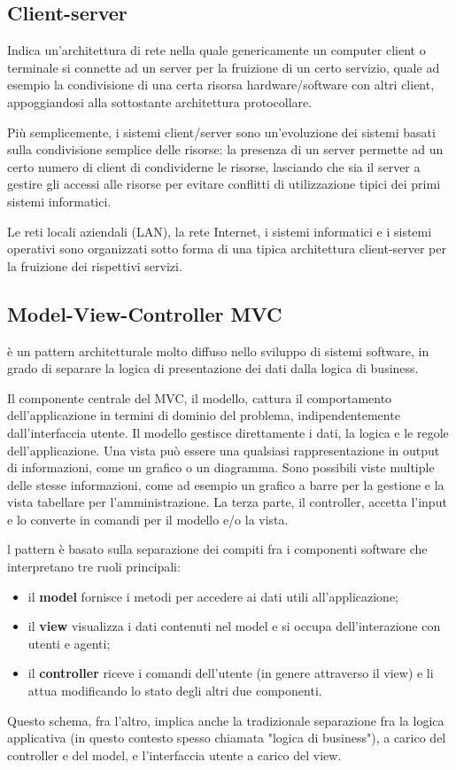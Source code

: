 \subsection{Client-server}
Indica un'architettura di rete nella quale genericamente un computer client o terminale si connette ad un server per la fruizione di un certo servizio, quale ad esempio la condivisione di una certa risorsa hardware/software con altri client, appoggiandosi alla sottostante architettura protocollare.

Più semplicemente, i sistemi client/server sono un'evoluzione dei sistemi basati sulla condivisione semplice delle risorse: la presenza di un server permette ad un certo numero di client di condividerne le risorse, lasciando che sia il server a gestire gli accessi alle risorse per evitare conflitti di utilizzazione tipici dei primi sistemi informatici.

Le reti locali aziendali (LAN), la rete Internet, i sistemi informatici e i sistemi operativi sono organizzati sotto forma di una tipica architettura client-server per la fruizione dei rispettivi servizi.
\subsection{Model-View-Controller MVC}
è un pattern architetturale molto diffuso nello sviluppo di sistemi software, in grado di separare la logica di presentazione dei dati dalla logica di business.

Il componente centrale del MVC, il modello, cattura il comportamento dell'applicazione in termini di dominio del problema, indipendentemente dall'interfaccia utente. Il modello gestisce direttamente i dati, la logica e le regole dell'applicazione. Una vista può essere una qualsiasi rappresentazione in output di informazioni, come un grafico o un diagramma. Sono possibili viste multiple delle stesse informazioni, come ad esempio un grafico a barre per la gestione e la vista tabellare per l'amministrazione. La terza parte, il controller, accetta l'input e lo converte in comandi per il modello e/o la vista.

l pattern è basato sulla separazione dei compiti fra i componenti software che interpretano tre ruoli principali:
\begin{itemize}
\item il \textbf{model} fornisce i metodi per accedere ai dati utili all'applicazione;
\item il \textbf{view} visualizza i dati contenuti nel model e si occupa dell'interazione con utenti e agenti;
\item il \textbf{controller} riceve i comandi dell'utente (in genere attraverso il view) e li attua modificando lo stato degli altri due componenti.
\end{itemize}
Questo schema, fra l'altro, implica anche la tradizionale separazione fra la logica applicativa (in questo contesto spesso chiamata "logica di business"), a carico del controller e del model, e l'interfaccia utente a carico del view.


